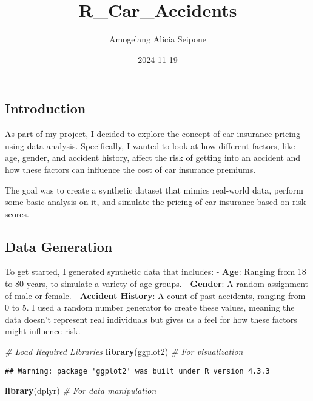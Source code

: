 \documentclass[
]{article}
\title{R\_Car\_Accidents}
\author{Amogelang Alicia Seipone}
\date{2024-11-19}
\newenvironment{Shaded}{\begin{snugshade}}{\end{snugshade}}
\newcommand{\CommentTok}[1]{\textcolor[rgb]{0.56,0.35,0.01}{\textit{#1}}}
\newcommand{\FunctionTok}[1]{\textcolor[rgb]{0.13,0.29,0.53}{\textbf{#1}}}
\newcommand{\NormalTok}[1]{#1}
\begin{document}
\maketitle

\subsection{Introduction}\label{introduction}

As part of my project, I decided to explore the concept of car insurance
pricing using data analysis. Specifically, I wanted to look at how
different factors, like age, gender, and accident history, affect the
risk of getting into an accident and how these factors can influence the
cost of car insurance premiums.

The goal was to create a synthetic dataset that mimics real-world data,
perform some basic analysis on it, and simulate the pricing of car
insurance based on risk scores.

\subsection{Data Generation}\label{data-generation}

To get started, I generated synthetic data that includes: -
\textbf{Age}: Ranging from 18 to 80 years, to simulate a variety of age
groups. - \textbf{Gender}: A random assignment of male or female. -
\textbf{Accident History}: A count of past accidents, ranging from 0 to
5. I used a random number generator to create these values, meaning the
data doesn't represent real individuals but gives us a feel for how
these factors might influence risk.

\begin{Shaded}
\begin{Highlighting}[]
\CommentTok{\# Load Required Libraries}
\FunctionTok{library}\NormalTok{(ggplot2) }\CommentTok{\# For visualization}
\end{Highlighting}
\end{Shaded}

\begin{verbatim}
## Warning: package 'ggplot2' was built under R version 4.3.3
\end{verbatim}

\begin{Shaded}
\begin{Highlighting}[]
\FunctionTok{library}\NormalTok{(dplyr)   }\CommentTok{\# For data manipulation}
\end{Highlighting}
\end{Shaded}
\end{document}
